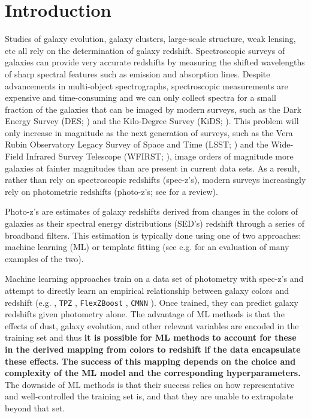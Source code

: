 \documentclass[twocolumn]{aastex63}
\begin{document}

\section{Introduction}
    Studies of galaxy evolution, galaxy clusters, large-scale structure, weak lensing, etc all rely on the determination of galaxy redshift.
    Spectroscopic surveys of galaxies can provide very accurate redshifts by measuring the shifted wavelengths of sharp spectral features such as emission and absorption lines.
    Despite advancements in multi-object spectrographs, spectroscopic measurements are expensive and time-consuming and we can only collect spectra for a small fraction of the galaxies that can be imaged by  modern surveys, such as the Dark Energy Survey (DES; \citealt{TheDarkEnergySurveyCollaboration2005}) and the Kilo-Degree Survey (KiDS; \citealt{DeJong2013a}).
    This problem will only increase in magnitude as the next generation of surveys, such as the Vera Rubin Observatory Legacy Survey of Space and Time (LSST; \citealt{LSSTScienceCollaboration2009}) and the Wide-Field Infrared Survey Telescope (WFIRST; \citealt{Green2012}), image orders of magnitude more galaxies at fainter magnitudes than are present in current data sets.
    As a result, rather than rely on spectroscopic redshifts (spec-z's), modern surveys increasingly rely on photometric redshifts (photo-z's; see \citealt{Salvato2019} for a review).

    Photo-z's are estimates of galaxy redshifts derived from changes in the colors of galaxies as their spectral energy distributions (SED's) redshift through a series of broadband filters.
    This estimation is typically done using one of two approaches: machine learning (ML) or template fitting (see e.g. \citealt{Schmidt2020} for an evaluation of many examples of the two).

    Machine learning approaches train on a data set of photometry with spec-z's and attempt to directly learn an empirical relationship between galaxy colors and redshift (e.g. \citealt{Connolly1995}, \texttt{TPZ} \citealt{Kind2013}, \texttt{FlexZBoost} \citealt{Izbicki2017}, \texttt{CMNN} \citealt{Graham2018a}).
    Once trained, they can predict galaxy redshifts given photometry alone.
    The advantage of ML methods is that the effects of dust, galaxy evolution, and other relevant variables are encoded in the training set and thus \textbf{it is possible for ML methods to account for these in the derived mapping from colors to redshift if the data encapsulate these effects.}
    \textbf{The success of this mapping depends on the  choice and complexity of the ML model and the corresponding hyperparameters.}
    The downside of ML methods is that their success relies on how representative and well-controlled the training set is, and that they are unable to extrapolate beyond that set.
\end{document}
